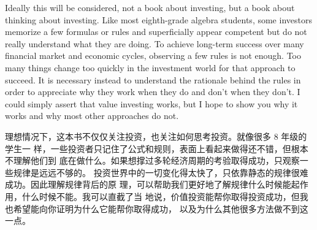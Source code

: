 \begin{verseparallel}
  {
    Ideally this will be considered, not a book about investing, but a book
    about thinking about investing. Like most eighth-grade algebra students,
    some investors memorize a few formulas or rules and superficially appear
    competent but do not really understand what they are doing. To achieve
    long-term success over many financial market and economic cycles, observing
    a few rules is not enough. Too many things change too quickly in the
    investment world for that approach to succeed. It is necessary instead to
    understand the rationale behind the rules in order to appreciate why they
    work when they do and don't when they don't. I could simply assert that
    value investing works, but I hope to show you why it works and why most
    other approaches do not. \\
  }
  {

    理想情况下，这本书不仅仅关注投资，也关注如何思考投资。就像很多 8 年级的学生一
    样，一些投资者只记住了公式和规则，表面上看起来做得还不错，但根本不理解他们到
    底在做什么。如果想撑过多轮经济周期的考验取得成功，只观察一些规律是远远不够的。
    投资世界中的一切变化得太快了，只依靠静态的规律很难成功。因此理解规律背后的原
    理，可以帮助我们更好地了解规律什么时候能起作用，什么时候不能。我可以直截了当
    地说，价值投资能帮你取得投资成功，但我也希望能向你证明为什么它能帮你取得成功，
    以及为什么其他很多方法做不到这一点。

  }
\end{verseparallel}

